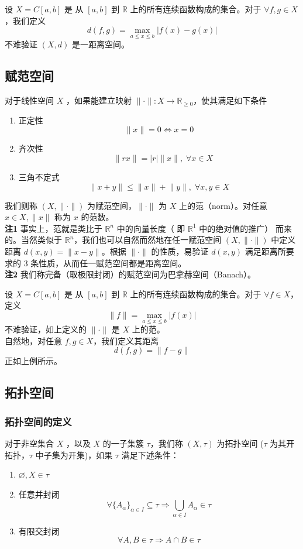 \documentclass{ctexbook}
\newcommand{\no}{\noindent}
\newcommand{\EXP}{\no {\bf 例}\quad}
\newcommand{\R}{\mathbb{R}}
\newcommand{\ITEMS}{\begin{enumerate}[leftmargin=4em]}
\newcommand{\ITEME}{\end{enumerate}}
\begin{document}
\EXP 设 $X = C[a,b]$ 是 从 $[a,b]$ 到 $\R$ 上的所有连续函数构成的集合。对于 $\forall f, g \in X$，我们定义
\[
	d(f,g) = \max_{a\le x\le b}\lvert f(x)-g(x)\rvert
\]
不难验证 $(X,d)$ 是一距离空间。

\subsection{赋范空间}

对于线性空间 $X$ ，如果能建立映射 $\lVert\cdot\rVert: X \to \mathbb{R}_{\ge 0}$，使其满足如下条件
\ITEMS
\item 正定性 \[\lVert x\rVert = 0 \iff x =0 \]
\item 齐次性 \[\quad\lVert r x\rVert = |r| \lVert x\rVert, \; \forall x \in X\]
\item 三角不定式 \[\lVert x + y\rVert \le \lVert x\rVert + \lVert y\rVert, \;\forall x, y \in X\]
\ITEME
我们则称 $(X,\lVert\cdot\rVert)$ 为赋范空间，$\lVert\cdot\rVert$ 为 $X$ 上的范（norm）。对任意 $x \in X, \lVert x\rVert$ 称为 $x$ 的范数。\\

{\bf 注1} 事实上，范就是类比于 $\R^n$ 中的向量长度（ 即 $\R^1$ 中的绝对值的推广） 而来的。当然类似于 $\R^n$，我们也可以自然而然地在任一赋范空间 $(X,\lVert\cdot\rVert)$ 中定义距离 $d(x,y) = \lVert x-y \rVert$。根据 $\lVert\cdot\rVert$ 的性质，易验证 $d(x,y)$ 满足距离所要求的 $3$ 条性质，从而任一赋范空间都是距离空间。\\

{\bf 注2} 我们称完备（取极限封闭）的赋范空间为巴拿赫空间（Banach）。

\bigskip

\EXP 设 $X = C[a,b]$ 是 从 $[a,b]$ 到 $\R$ 上的所有连续函数构成的集合。对于 $\forall f \in X$，定义 
\[
\lVert f \rVert = \max_{a\le x\le b}\lvert f(x)\rvert
\]
不难验证，如上定义的 $\lVert \cdot \rVert$ 是 $X$ 上的范。\\

自然地，对任意 $f, g \in X$，我们定义其距离
\[
d(f,g) = \lVert f-g \rVert
\]
正如上例所示。

\subsection{拓扑空间}

\subsubsection{拓扑空间的定义}

对于非空集合 $X$ ，以及 $X$ 的一子集簇 $\tau$，我们称 $(X,\tau)$ 为拓扑空间 ($\tau$ 为其开拓扑，$\tau$ 中子集为开集)，如果 $\tau$ 满足下述条件：
\ITEMS
\item $\varnothing , X \in \tau$
\item 任意并封闭
\[
\forall \{ A_\alpha\}_{\alpha \in I} \subseteq \tau \Rightarrow \bigcup_{\alpha \in I} A_\alpha \in \tau
\]
\item 有限交封闭
\[
\forall A , B \in \tau \Rightarrow A \cap B \in \tau
\]
\ITEME
\end{document}
